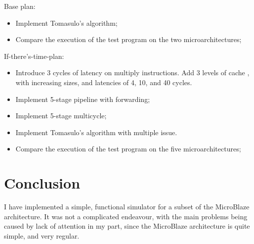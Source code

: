 \documentclass[]{IEEEtran}
\begin{document}
Base plan:
\begin{itemize}
\item Implement Tomasulo's algorithm;
\item Compare the execution of the test program on the two microarchitectures;
\end{itemize}

If-there's-time-plan:
\begin{itemize}
\item Introduce 3 cycles of latency on multiply instructions. Add 3 levels of
cache , with increasing sizes, and latencies of 4, 10, and 40 cycles.
\item Implement 5-stage pipeline with forwarding;
\item Implement 5-stage multicycle;
\item Implement Tomasulo's algorithm with multiple issue.
\item Compare the execution of the test program on the five microarchitectures;
\end{itemize}


\section{Conclusion}

I have implemented a simple, functional simulator for a subset of the MicroBlaze
architecture. It was not a complicated endeavour, with the main problems being
caused by lack of attention in my part, since the MicroBlaze architecture is
quite simple, and very regular.
\end{document}
